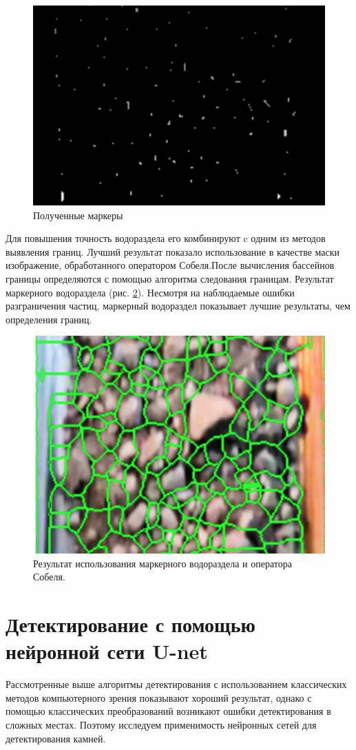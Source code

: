 \documentclass[times]{itmo-student-thesis}
\begin{document}
\begin{figure}[h!]
	\centering
	\includegraphics[width=0.6\linewidth]{images/markers}
	\caption{Полученные маркеры}
	\label{fig:markers}
\end{figure}

Для повышения точность водораздела его комбинируют c одним из методов выявления границ. Лучший результат показало использование в качестве маски изображение, обработанного оператором Собеля.После вычисления бассейнов границы определяются с помощью алгоритма следования границам.  Результат маркерного водораздела (рис. \ref{fig:final}). Несмотря на наблюдаемые ошибки разграничения частиц, маркерный водораздел показывает лучшие результаты, чем определения границ.

\begin{figure}[h!]
	\centering
	\includegraphics[width=0.6\linewidth]{images/final}
	\caption{Результат использования маркерного водораздела и оператора Собеля.}
	\label{fig:final}
\end{figure}

\section{Детектирование с помощью нейронной сети U-net}
Рассмотренные выше алгоритмы детектирования с использованием классических методов компьютерного зрения показывают хороший результат, однако с помощью классических преобразований возникают ошибки детектирования в сложных местах. Поэтому исследуем применимость нейронных сетей для детектирования камней. 
\end{document}
